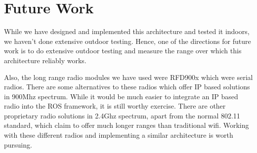 \section{Future Work}
While we have designed and implemented this architecture and tested it indoors, we haven't done extensive outdoor testing. Hence, one of the directions for future work is to do extensive outdoor testing and measure the range over which this architecture reliably works.

Also, the long range radio modules we have used were RFD900x which were serial radios. There are some alternatives to these radios which offer IP based solutions in 900Mhz spectrum. While it would be much easier to integrate an IP based radio into the ROS framework, it is still worthy exercise. There are other proprietary radio solutions in 2.4Ghz spectrum, apart from the normal 802.11 standard, which claim to offer much longer ranges than traditional wifi. Working with these different radios and implementing a similar architecture is worth pursuing.